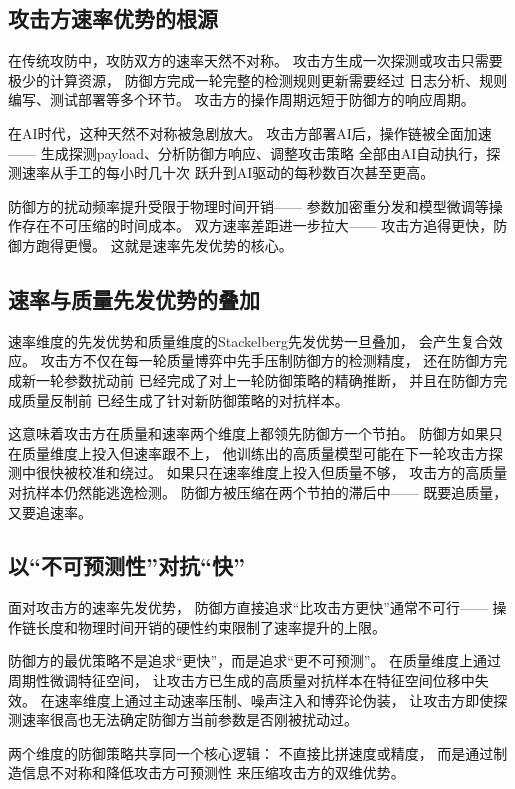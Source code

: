 \documentclass[11pt,a4paper]{article}
\begin{document}
\subsection{攻击方速率优势的根源}

在传统攻防中，攻防双方的速率天然不对称。
攻击方生成一次探测或攻击只需要极少的计算资源，
防御方完成一轮完整的检测规则更新需要经过
日志分析、规则编写、测试部署等多个环节。
攻击方的操作周期远短于防御方的响应周期。

在AI时代，这种天然不对称被急剧放大。
攻击方部署AI后，操作链被全面加速——
生成探测payload、分析防御方响应、调整攻击策略
全部由AI自动执行，探测速率从手工的每小时几十次
跃升到AI驱动的每秒数百次甚至更高。

防御方的扰动频率提升受限于物理时间开销——
参数加密重分发和模型微调等操作存在不可压缩的时间成本。
双方速率差距进一步拉大——
攻击方追得更快，防御方跑得更慢。
这就是速率先发优势的核心。

\subsection{速率与质量先发优势的叠加}

速率维度的先发优势和质量维度的Stackelberg先发优势一旦叠加，
会产生复合效应。
攻击方不仅在每一轮质量博弈中先手压制防御方的检测精度，
还在防御方完成新一轮参数扰动前
已经完成了对上一轮防御策略的精确推断，
并且在防御方完成质量反制前
已经生成了针对新防御策略的对抗样本。

这意味着攻击方在质量和速率两个维度上都领先防御方一个节拍。
防御方如果只在质量维度上投入但速率跟不上，
他训练出的高质量模型可能在下一轮攻击方探测中很快被校准和绕过。
如果只在速率维度上投入但质量不够，
攻击方的高质量对抗样本仍然能逃逸检测。
防御方被压缩在两个节拍的滞后中——
既要追质量，又要追速率。

\subsection{以“不可预测性”对抗“快”}

面对攻击方的速率先发优势，
防御方直接追求“比攻击方更快”通常不可行——
操作链长度和物理时间开销的硬性约束限制了速率提升的上限。

防御方的最优策略不是追求“更快”，而是追求“更不可预测”。
在质量维度上通过周期性微调特征空间，
让攻击方已生成的高质量对抗样本在特征空间位移中失效。
在速率维度上通过主动速率压制、噪声注入和博弈论伪装，
让攻击方即使探测速率很高也无法确定防御方当前参数是否刚被扰动过。

两个维度的防御策略共享同一个核心逻辑：
不直接比拼速度或精度，
而是通过制造信息不对称和降低攻击方可预测性
来压缩攻击方的双维优势。
\end{document}

